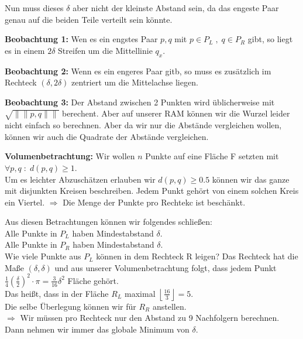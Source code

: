 Nun muss dieses $\delta$ aber nicht der kleinste Abstand sein, da das engeste Paar genau auf die beiden Teile verteilt sein könnte.

\begin{description}
\item{\bfseries Beobachtung 1:} Wen es ein engstes Paar $p,q$ mit $p\in P_L \; , \; q \in P_R$ gibt, so liegt es in einem $2 \delta$ Streifen um die Mittellinie $q_x$.
\item{\bfseries Beobachtung 2:} Wenn es ein engeres Paar gitb, so muss es zusätzlich im Rechteck $(\delta , 2\delta)$ zentriert um die Mittelachse liegen.
\item{\bfseries Beobachtung 3:} Der Abstand zwischen 2 Punkten wird üblicherweise mit $\sqrt{\|\| p,q\|\|}$ berechent. Aber auf unserer RAM können wir die Wurzel leider nicht einfach so berechnen. Aber da wir nur die Abstände vergleichen wollen, können wir auch die Quadrate der Abstände vergleichen.
\item{\bfseries Volumenbetrachtung:} Wir wollen $n$ Punkte auf eine Fläche F setzten mit $\forall p,q \; : \; d(p,q) \geq 1$.\\
Um es leichter Abzuschätzen erlauben wir $d(p,q)\geq 0.5$ können wir das ganze mit disjunkten Kreisen beschreiben. Jedem Punkt gehört von einem solchen Kreis ein Viertel.
$\Rightarrow $ Die Menge der Punkte pro Rechtekc ist beschänkt.
\end{description}

Aus diesen Betrachtungen können wir folgendes schließen:\\
Alle Punkte in $P_L$ haben Mindestabstand $\delta$.\\
Alle Punkte in $P_R$ haben Mindestabstand $\delta$.\\
Wie viele Punkte aus $P_L$ können in dem Rechteck R leigen? Das Rechteck hat die Maße $(\delta , \delta)$ und aus unserer Volumenbetrachtung folgt, dass jedem Punkt $\frac{1}{4}(\frac{\delta}{2})^2 \cdot \pi = \frac{3}{16} \delta^2$ Fläche gehört.\\
Das heißt, dass in der Fläche $R_L$ maximal $\left\lfloor \frac{16}{3}\right\rfloor = 5$.\\

Die selbe Überlegung können wir für $R_R$ anstellen.\\

$\Rightarrow$ Wir müssen pro Rechteck nur den Abstand zu 9 Nachfolgern berechnen. Dann nehmen wir immer das globale Minimum von $\delta$.\\

